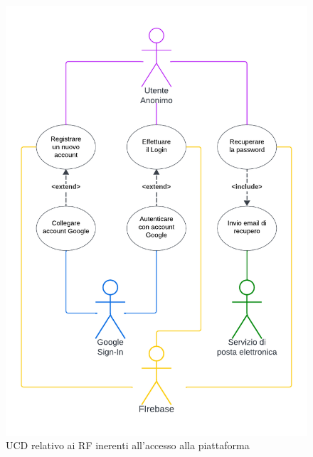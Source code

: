 \documentclass[11pt, a4paper]{article}
\theoremstyle{definition} %
\begin{document}
\begin{figure}[H]
\centering
\includegraphics[scale=0.72]{materiale/ucdiagrams/ucaccesso.pdf}
\caption{UCD relativo ai RF inerenti all'accesso alla piattaforma}
\label{access}
\end{figure}
\end{document}
